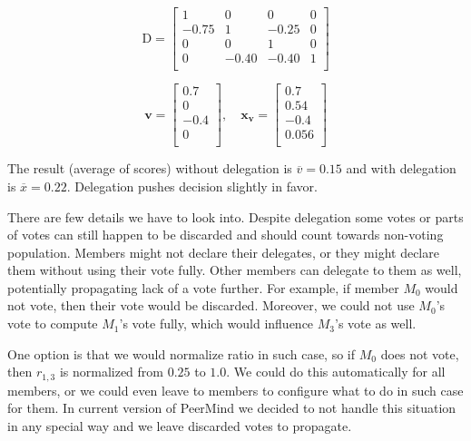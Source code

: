 \documentclass{sigchi}
\begin{document}
\begin{displaymath}
\mathrm{D} = \left[ \begin{array}{cccc}
1 & 0 & 0 & 0 \\
-0.75 & 1 & -0.25 & 0 \\
0 & 0 & 1 & 0 \\
0 & -0.40 & -0.40 & 1 \\
\end{array} \right]
\end{displaymath}

\begin{displaymath}
\mathbf{v} = \left[ \begin{array}{c}
0.7 \\
0 \\
-0.4 \\
0 \\
\end{array} \right],\quad \mathbf{x_v} = \left[ \begin{array}{c}
0.7 \\
0.54 \\
-0.4 \\
0.056 \\
\end{array} \right]
\end{displaymath}

The result (average of scores) without delegation is $\overline{v} = 0.15$ and
with delegation is $\overline{x} = 0.22$.
Delegation pushes decision slightly in favor.

There are few details we have to look into.
Despite delegation some votes or parts of votes can still happen to be discarded and should count
towards non-voting population.
Members might not declare their delegates, or they might declare them without using their vote fully.
Other members can delegate to them as well, potentially propagating lack of a vote further.
For example, if member $M_0$ would not vote, then their vote would be discarded.
Moreover, we could not use $M_0$'s vote to compute $M_1$'s vote fully, which would influence $M_3$'s vote as well.

One option is that we would normalize ratio in such case, so if $M_0$ does not vote, then $r_{1,3}$ is normalized
from $0.25$ to $1.0$.
We could do this automatically for all members, or we could even leave to members to configure
what to do in such case for them.
In current version of PeerMind we decided to not handle this situation in any special way and we leave
discarded votes to propagate.
\end{document}

